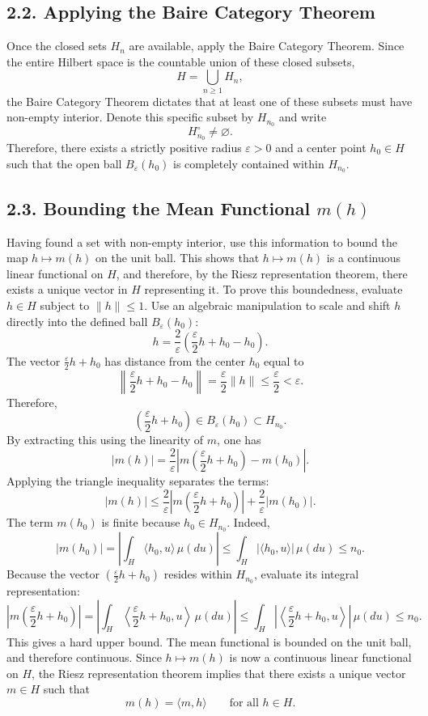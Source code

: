 \documentclass[11pt]{article}
\theoremstyle{definition}
\theoremstyle{remark}
\begin{document}
\subsection*{2.2. Applying the Baire Category Theorem}
Once the closed sets $H_n$ are available, apply the Baire Category Theorem. Since the entire Hilbert space is the countable union of these closed subsets,
\[
H=\bigcup_{n\ge 1} H_n,
\]
the Baire Category Theorem dictates that at least one of these subsets must have non-empty interior. Denote this specific subset by $H_{n_0}$ and write
\[
H^\circ_{n_0}\neq\varnothing.
\]
Therefore, there exists a strictly positive radius $\varepsilon>0$ and a center point $h_0\in H$ such that the open ball $B_\varepsilon(h_0)$ is completely contained within $H_{n_0}$.

\subsection*{2.3. Bounding the Mean Functional $m(h)$}
Having found a set with non-empty interior, use this information to bound the map $h\mapsto m(h)$ on the unit ball. This shows that $h\mapsto m(h)$ is a continuous linear functional on $H$, and therefore, by the Riesz representation theorem, there exists a unique vector in $H$ representing it. To prove this boundedness, evaluate $h\in H$ subject to $\|h\|\le 1$. Use an algebraic manipulation to scale and shift $h$ directly into the defined ball $B_\varepsilon(h_0)$:
\[
h=\frac{2}{\varepsilon}\left(\frac{\varepsilon}{2}h+h_0-h_0\right).
\]
The vector \(\frac{\varepsilon}{2}h+h_0\) has distance from the center \(h_0\) equal to
\[
\left\|\frac{\varepsilon}{2}h+h_0-h_0\right\|=\frac{\varepsilon}{2}\|h\|\le \frac{\varepsilon}{2}<\varepsilon.
\]
Therefore,
\[
\left(\frac{\varepsilon}{2}h+h_0\right)\in B_\varepsilon(h_0)\subset H_{n_0}.
\]
By extracting this using the linearity of $m$, one has
\[
|m(h)|=\frac{2}{\varepsilon}\left|m\left(\frac{\varepsilon}{2}h+h_0\right)-m(h_0)\right|.
\]
Applying the triangle inequality separates the terms:
\[
|m(h)|\le \frac{2}{\varepsilon}\left|m\left(\frac{\varepsilon}{2}h+h_0\right)\right|+\frac{2}{\varepsilon}|m(h_0)|.
\]
The term \(m(h_0)\) is finite because \(h_0\in H_{n_0}\). Indeed,
\[
|m(h_0)|
=
\left|\int_H \langle h_0,u\rangle\,\mu(du)\right|
\le
\int_H |\langle h_0,u\rangle|\,\mu(du)
\le n_0.
\]
Because the vector \(\left(\frac{\varepsilon}{2}h+h_0\right)\) resides within $H_{n_0}$, evaluate its integral representation:
\[
\left|m\left(\frac{\varepsilon}{2}h+h_0\right)\right|
=
\left|\int_H \left\langle \frac{\varepsilon}{2}h+h_0,u\right\rangle\,\mu(du)\right|
\le
\int_H \left|\left\langle \frac{\varepsilon}{2}h+h_0,u\right\rangle\right|\,\mu(du)
\le n_0.
\]
This gives a hard upper bound. The mean functional is bounded on the unit ball, and therefore continuous.
Since \(h\mapsto m(h)\) is now a continuous linear functional on \(H\), the Riesz representation theorem implies that there exists a unique vector \(m\in H\) such that
\[
m(h)=\langle m,h\rangle
\qquad \text{for all } h\in H.
\]
\end{document}
